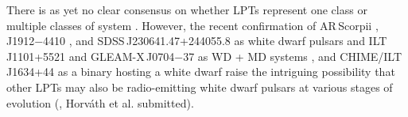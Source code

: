 \documentclass[fleqn,usenatbib]{mnras}
\newcommand{\revision}[2]{{\color{red}#2}}
\begin{document}


\revision{Although there}{There} is as yet no clear consensus on whether LPTs represent one class or multiple classes of system \citep[e.g.][]{2024ApJ...961..214R}\revision{}{. However}, the recent confirmation of \revision{J1912$-$4410 as a pre-evolved white dwarf pulsar \citep{2023NatAs...7..931P}}{AR\,Scorpii \citep{2016Natur.537..374M}, J1912$-$4410 \citep{2023NatAs...7..931P}, and SDSS\,J230641.47+244055.8 \citep{2025arXiv250620455C} as white dwarf pulsars} and ILT\,J1101+5521 and GLEAM-X\,J0704$-$37 as \revision{likely candidates for polars or polar-like systems}{WD + MD systems} \citep{deRuiter2025,2025A&A...695L...8R}\revision{}{, and CHIME/ILT J1634+44 as a binary hosting a white dwarf \citep[possibly two,][]{2025arXiv250705139D,2025arXiv250705078B}} raise the intriguing possibility that other LPTs may also be radio-emitting white dwarf pulsars at various stages of evolution (\citealt{2021NatAs...5..648S}, Horv\'{a}th et al. submitted).
\end{document}
